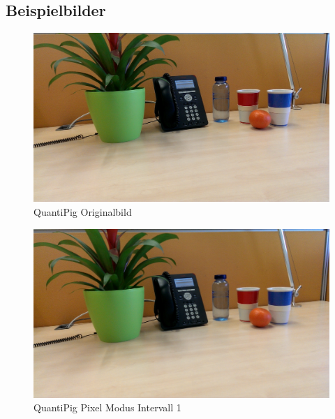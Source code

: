 \newpage



\subsection{Beispielbilder}
\begin{landscape}


\begin{figure}[h]
	\centering
		\includegraphics[width=1.4\textwidth]{img/Fotos/QuantiPig_Original.png}
	\caption[QuantiPig Originalbild]{QuantiPig Originalbild}
	\label{fig:pig_original}
\end{figure}

\begin{figure}[h]
	\centering
		\includegraphics[width=1.4\textwidth]{img/Fotos/QuantiPig_Pixel_1.png}
	\caption[QuantiPig Pixel Modus Intervall 1]{QuantiPig Pixel Modus Intervall 1}
	\label{fig:pig_pix1}
\end{figure}


\end{landscape}
